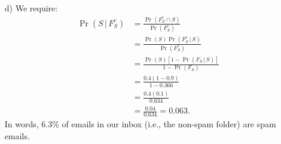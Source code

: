 \documentclass[12pt]{article}
\begin{document}
{\begin{minipage}[t]{0.98\textwidth}
\begin{minipage}[t]{0.47\textwidth}
\begin{enumerate}
\begin{align*}
\Pr(S\,|\,F_S) &= \frac{\Pr(S \cap F_S)}{\Pr(F_S)} \\
               &= \frac{0.36}{0.366} = 0.984.
\end{align*}
$\Rightarrow$ If the email is in the spam folder, we are quite sure that it is spam.
\item[d)] We require:\\[-0.8cm]
\begin{align*}
\Pr(S\,|\,F_S^c) &= \frac{\Pr(F_S^c \cap S)}{\Pr(F_S^c)} \\[0.2cm]
               &= \frac{\Pr(S) \Pr(F_S^c\,|\,S)}{\Pr(F_S^c)} \\[0.2cm]
               &= \frac{\Pr(S) [1- \Pr(F_S\,|\,S)]}{1 - \Pr(F_S)} \\[0.2cm]
               &= \frac{0.4 (1- 0.9)}{1 - 0.366} \\[0.2cm]
               &= \frac{0.4 (0.1)}{0.634} \\[0.2cm]
               &= \frac{0.04}{0.634} = 0.063.
\end{align*}
In words, 6.3\% of emails in our inbox (i.e., the non-spam folder) are spam emails.
\end{enumerate}
\end{minipage}
\end{minipage}}\vspace{0.03\textwidth}

\vspace{0.03\textwidth}
\end{document}
